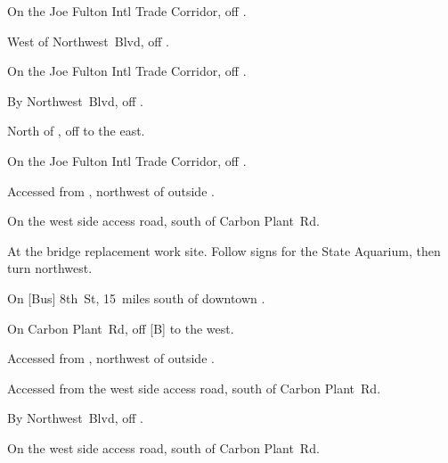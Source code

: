 

\begin{LocationList}

On the Joe Fulton Intl Trade Corridor, off  .

\Location{\GarageHQ \Garage}
West of  Northwest~Blvd, off .

On the Joe Fulton Intl Trade Corridor, off  .

By  Northwest~Blvd, off .

North of , off   to the east.

On the Joe Fulton Intl Trade Corridor, off  .

Accessed from , northwest of  outside .

\Location{\RecruitmentAgency \Recruitment}
On the west side  access road, south of Carbon Plant~Rd.

At the  bridge replacement work site. Follow signs for the State Aquarium, then turn northwest.

On [Bus] 8th~St, 15~miles south of downtown .

\Location{\TruckStop \Gas \Rest \Service}
On Carbon Plant~Rd, off  [B] to the west.

Accessed from , northwest of  outside .

Accessed from the west side  access road, south of Carbon Plant~Rd.

By  Northwest~Blvd, off .

On the west side  access road, south of Carbon Plant~Rd.

\end{LocationList}
